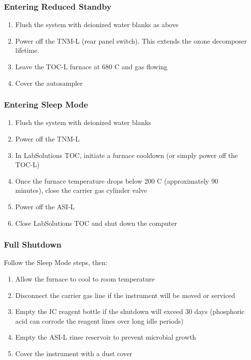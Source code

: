 \documentclass[
  11pt,
  letterpaper,
]{article}
\providecommand{\tightlist}{%
  \setlength{\itemsep}{0pt}\setlength{\parskip}{0pt}}
\begin{document}
\subsubsection{Entering Reduced Standby}\label{entering-reduced-standby}

\begin{enumerate}
\def\labelenumi{\arabic{enumi}.}
\tightlist
\item
  Flush the system with deionized water blanks as above
\item
  Power off the TNM-L (rear panel switch). This extends the ozone
  decomposer lifetime.
\item
  Leave the TOC-L furnace at 680 C and gas flowing
\item
  Cover the autosampler
\end{enumerate}

\subsubsection{Entering Sleep Mode}\label{entering-sleep-mode}

\begin{enumerate}
\def\labelenumi{\arabic{enumi}.}
\tightlist
\item
  Flush the system with deionized water blanks
\item
  Power off the TNM-L
\item
  In LabSolutions TOC, initiate a furnace cooldown (or simply power off
  the TOC-L)
\item
  Once the furnace temperature drops below 200 C (approximately 90
  minutes), close the carrier gas cylinder valve
\item
  Power off the ASI-L
\item
  Close LabSolutions TOC and shut down the computer
\end{enumerate}

\subsubsection{Full Shutdown}\label{full-shutdown}

Follow the Sleep Mode steps, then:

\begin{enumerate}
\def\labelenumi{\arabic{enumi}.}
\tightlist
\item
  Allow the furnace to cool to room temperature
\item
  Disconnect the carrier gas line if the instrument will be moved or
  serviced
\item
  Empty the IC reagent bottle if the shutdown will exceed 30 days
  (phosphoric acid can corrode the reagent lines over long idle periods)
\item
  Empty the ASI-L rinse reservoir to prevent microbial growth
\item
  Cover the instrument with a dust cover
\end{enumerate}
\end{document}
